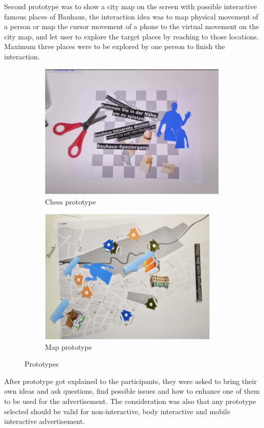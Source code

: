 Second prototype was to show a city map on the screen with possible interactive famous places of Bauhaus, the interaction idea was to map physical movement of a person or map the cursor movement of a phone to the virtual movement on the city map, and let user to explore the target places by reaching to those locations. Maximum three places were to be explored by one person to finish the interaction.


\begin{figure}[H]
    \centering
    \begin{subfigure}[H]{0.7\textwidth}
        \centering
        \includegraphics[width=\textwidth,height=6.5cm]{Figures/4/chess}
        \caption{Chess prototype }
        \label{fig:chesspro}
    \end{subfigure}
    \begin{subfigure}[H]{0.7\textwidth}
        \centering
        \includegraphics[width=\textwidth,height=6.5cm]{Figures/4/map}
        \caption{Map prototype}
        \label{fig:mapprot}
    \end{subfigure}
    \caption{Prototypes}
    \label{fig:map_chess_prototypes}
\end{figure}


After prototype got explained to the participants, they were asked to bring their own ideas and ask questions, find possible issues and how to enhance one of them to be used for the advertisement. The consideration was also that any prototype selected should be valid for non-interactive, body interactive and mobile interactive advertisement.


